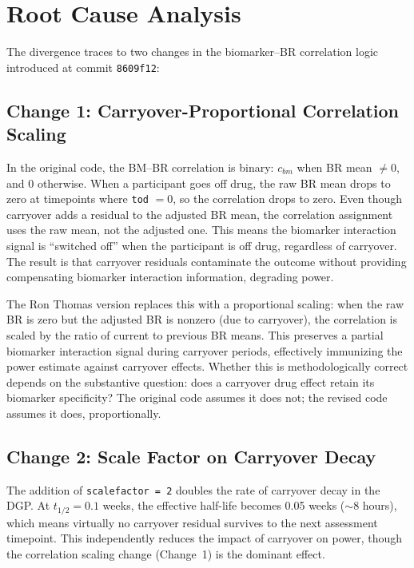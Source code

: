 \documentclass[11pt]{article}
\begin{document}
\section{Root Cause Analysis}

The divergence traces to two changes in the biomarker--BR
correlation logic introduced at commit \texttt{8609f12}:

\subsection{Change 1: Carryover-Proportional Correlation Scaling}

In the original code, the BM--BR correlation is binary:
$c_{bm}$ when BR mean $\neq 0$, and 0 otherwise. When a
participant goes off drug, the raw BR mean drops to zero at
timepoints where \texttt{tod} $= 0$, so the correlation drops
to zero. Even though carryover adds a residual to the adjusted
BR mean, the correlation assignment uses the raw mean, not the
adjusted one. This means the biomarker interaction signal is
``switched off'' when the participant is off drug, regardless of
carryover. The result is that carryover residuals contaminate the
outcome without providing compensating biomarker interaction
information, degrading power.

The Ron Thomas version replaces this with a proportional scaling:
when the raw BR is zero but the adjusted BR is nonzero (due to
carryover), the correlation is scaled by the ratio of current to
previous BR means. This preserves a partial biomarker interaction
signal during carryover periods, effectively immunizing the power
estimate against carryover effects. Whether this is
methodologically correct depends on the substantive question:
does a carryover drug effect retain its biomarker specificity?
The original code assumes it does not; the revised code assumes
it does, proportionally.

\subsection{Change 2: Scale Factor on Carryover Decay}

The addition of \texttt{scalefactor = 2} doubles the rate of
carryover decay in the DGP. At $t_{1/2} = 0.1$ weeks, the
effective half-life becomes 0.05 weeks ($\sim$8 hours), which
means virtually no carryover residual survives to the next
assessment timepoint. This independently reduces the impact of
carryover on power, though the correlation scaling change
(Change~1) is the dominant effect.
\end{document}
